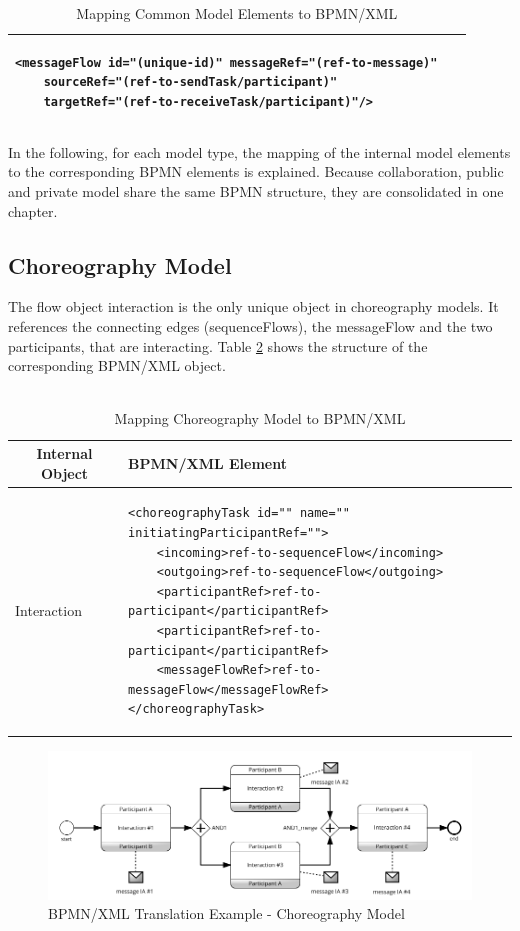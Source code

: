 \begin{table}[H]
\begin{tabular}{l|l}
\begin{lstlisting}
<messageFlow id="(unique-id)" messageRef="(ref-to-message)" 
	sourceRef="(ref-to-sendTask/participant)" 
	targetRef="(ref-to-receiveTask/participant)"/>          
\end{lstlisting} \\ \hline
\end{tabular}
\caption{Mapping Common Model Elements to BPMN/XML}
\label{tbl:common2bpmn}
\end{table}

In the following, for each model type, the mapping of the internal model elements to the corresponding BPMN elements is explained. Because collaboration, public and private model share the same BPMN structure, they are consolidated in one chapter.

\subsection{Choreography Model}

The flow object interaction is the only unique object in choreography models. It references the connecting edges (sequenceFlows), the messageFlow and the two participants, that are interacting. Table \ref{tbl:choreo2bpmn} shows the structure of the corresponding BPMN/XML object. 
\\
\\
\begin{table}[H]
\centering
\begin{tabular}{l|l}
\multicolumn{1}{c|}{\textbf{Internal Object}} & \multicolumn{1}{l}{\textbf{BPMN/XML Element}}     \\ \hline
Interaction & 
\begin{lstlisting}
<choreographyTask id="" name="" initiatingParticipantRef="">
	<incoming>ref-to-sequenceFlow</incoming>
	<outgoing>ref-to-sequenceFlow</outgoing>
	<participantRef>ref-to-participant</participantRef>
	<participantRef>ref-to-participant</participantRef>
  	<messageFlowRef>ref-to-messageFlow</messageFlowRef>
</choreographyTask>
\end{lstlisting} \\ \hline
\end{tabular}
\caption{Mapping Choreography Model to BPMN/XML}
\label{tbl:choreo2bpmn}
\end{table}


\begin{figure}[H]
\includegraphics[width=1\textwidth]{src/images/choreo2bpmn.png}
\caption{BPMN/XML Translation Example - Choreography Model}
\label{fig:choreo2bpmn}
\end{figure}

